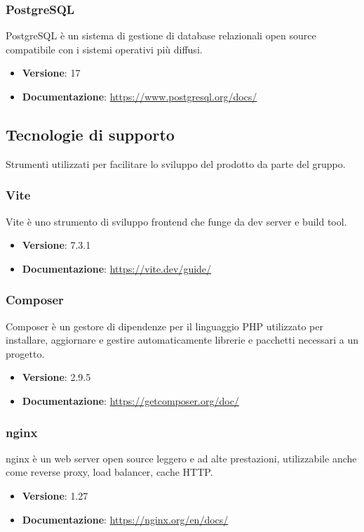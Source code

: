 \documentclass[a4paper,10pt]{article}
\begin{document}
\subsubsection{PostgreSQL}
PostgreSQL è un sistema di gestione di database relazionali open source compatibile con i sistemi operativi più diffusi.
\begin{itemize}
    \item \textbf{Versione}: 17
    \item \textbf{Documentazione}: \url{https://www.postgresql.org/docs/}
\end{itemize}

\subsection{Tecnologie di supporto}
Strumenti utilizzati per facilitare lo sviluppo del prodotto da parte del gruppo.

\subsubsection{Vite}
Vite è uno strumento di sviluppo frontend che funge da dev server e build tool.
\begin{itemize}
    \item \textbf{Versione}: 7.3.1
    \item \textbf{Documentazione}: \url{https://vite.dev/guide/}
\end{itemize}

\subsubsection{Composer}
Composer è un gestore di dipendenze per il linguaggio PHP utilizzato per installare, aggiornare e gestire automaticamente librerie e pacchetti necessari a un progetto.
\begin{itemize}
    \item \textbf{Versione}: 2.9.5
    \item \textbf{Documentazione}: \url{https://getcomposer.org/doc/}
\end{itemize}

\subsubsection{nginx}
nginx è un web server open source leggero e ad alte prestazioni, utilizzabile anche come reverse proxy, load balancer, cache HTTP.
\begin{itemize}
    \item \textbf{Versione}: 1.27
    \item \textbf{Documentazione}: \url{https://nginx.org/en/docs/}
\end{itemize}
\end{document}

